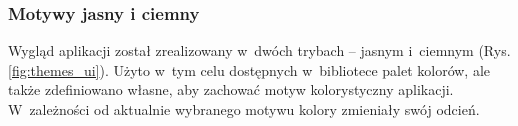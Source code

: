 \FloatBarrier

\subsubsection{Motywy jasny i ciemny}

Wygląd aplikacji został zrealizowany w~dwóch trybach --
jasnym i~ciemnym (Rys. \ref{fig:themes_ui}). Użyto w~tym celu dostępnych w~bibliotece
palet kolorów, ale także zdefiniowano własne, aby zachować
motyw kolorystyczny aplikacji. W~zależności od aktualnie
wybranego motywu kolory zmieniały swój odcień.



